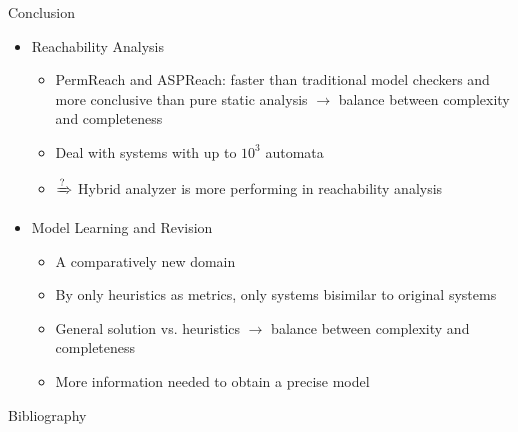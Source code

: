 \documentclass[8pt]{beamer}
\begin{document}
\begin{frame}{Conclusion}
\begin{itemize}
    \item Reachability Analysis
    \begin{itemize}
        \item PermReach and ASPReach: faster than traditional model checkers and more conclusive than pure static analysis $\to$ balance between complexity and completeness
        \item Deal with systems with up to $10^3$ automata
        \item $\xRightarrow{\text{?}}$ Hybrid analyzer is more performing in reachability analysis
    \end{itemize}
    \item Model Learning and Revision
    \begin{itemize}
        \item A comparatively new domain
        \item By only heuristics as metrics, only systems bisimilar to original systems
        \item General solution vs. heuristics $\to$ balance between complexity and completeness
        \item More information needed to obtain a precise model 
    \end{itemize}
\end{itemize}
\end{frame}

\begin{frame}{Bibliography}
    
    
\end{frame}
\end{document}
